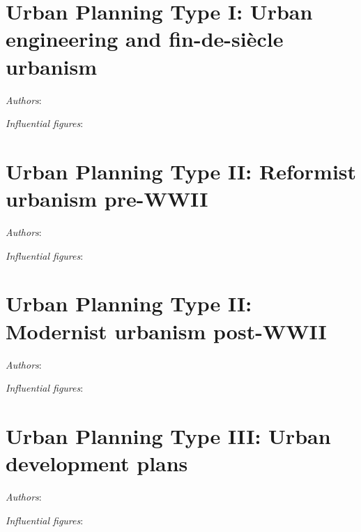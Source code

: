 \documentclass{article}
\begin{document}
\section{Urban Planning Type I: Urban engineering and fin-de-siècle urbanism}

\textit{Authors}:

\textit{Influential figures}:

\section{Urban Planning Type II: Reformist urbanism pre-WWII}

\textit{Authors}:

\textit{Influential figures}:

\section{Urban Planning Type II: Modernist urbanism post-WWII}

\textit{Authors}:

\textit{Influential figures}:

\section{Urban Planning Type III: Urban development plans}

\textit{Authors}:

\textit{Influential figures}:


\printbibliography
\end{document}

